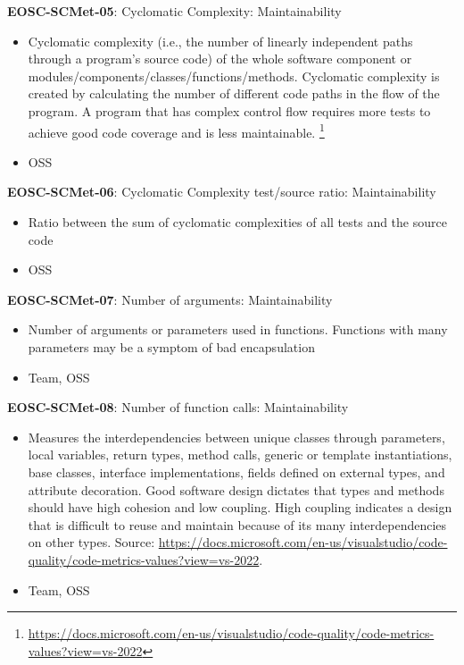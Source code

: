 \textbf{EOSC-SCMet-05}: Cyclomatic Complexity: Maintainability

\begin{itemize}
    \item Cyclomatic complexity (i.e.,  the number of linearly independent paths through a program's source code) of the whole software component or modules/components/classes/functions/methods. Cyclomatic complexity is created by calculating the number of different code paths in the flow of the program. A program that has complex control flow requires more tests to achieve good code coverage and is less maintainable. \footnote{\url{https://docs.microsoft.com/en-us/visualstudio/code-quality/code-metrics-values?view=vs-2022}} \cite{srisopha_software_2018,montagud_systematic_2012,baggen_standardized_2012,nagappan_early_2005}
    \item OSS
\end{itemize}

\textbf{EOSC-SCMet-06}: Cyclomatic Complexity test/source ratio: Maintainability

\begin{itemize}
    \item Ratio between the sum of cyclomatic complexities of all tests and the source code \cite{nagappan_early_2005}
    \item OSS
\end{itemize}

\textbf{EOSC-SCMet-07}: Number of arguments: Maintainability

\begin{itemize}
    \item Number of arguments or parameters used in functions. Functions with many parameters may be a symptom of bad encapsulation \cite{baggen_standardized_2012,ogasawara_experiences_1996}
    \item Team, OSS
\end{itemize}

\textbf{EOSC-SCMet-08}: Number of function calls: Maintainability

\begin{itemize}
    \item Measures the interdependencies between unique classes through parameters, local variables, return types, method calls, generic or template instantiations, base classes, interface implementations, fields defined on external types, and attribute decoration. Good software design dictates that types and methods should have high cohesion and low coupling. High coupling indicates a design that is difficult to reuse and maintain because of its many interdependencies on other types. Source: \url{https://docs.microsoft.com/en-us/visualstudio/code-quality/code-metrics-values?view=vs-2022}. \cite{montagud_systematic_2012,ogasawara_experiences_1996}
    \item Team, OSS
\end{itemize}

